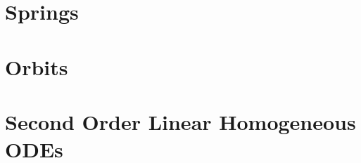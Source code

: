 \documentclass{article}
\begin{document}
\newpage

\section{Springs}

\section{Orbits}

\newpage

\appendix

\section{Second Order Linear Homogeneous ODEs} \label{app:ODEs}
\end{document}
